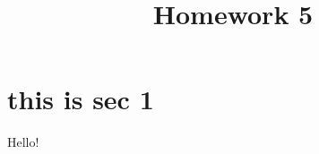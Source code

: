 \documentclass{article}
\title{Homework 5}
\begin{document}
\maketitle %

\section{this is sec 1}

Hello!
\end{document}
